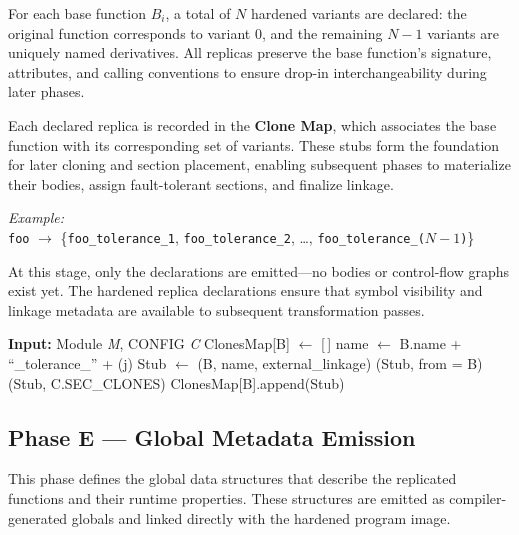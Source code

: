 For each base function \(B_i\), a total of \(N\) hardened variants are declared:
the original function corresponds to variant 0, and the remaining \(N{-}1\)
variants are uniquely named derivatives. All replicas preserve the base
function’s signature, attributes, and calling conventions to ensure drop-in
interchangeability during later phases.

Each declared replica is recorded in the \textbf{Clone Map}, which associates
the base function with its corresponding set of variants. These stubs form
the foundation for later cloning and section placement, enabling subsequent
phases to materialize their bodies, assign fault-tolerant sections, and
finalize linkage.

\begin{center}
\textit{Example:} \\
\texttt{foo} $\rightarrow$ 
\{\texttt{foo\_tolerance\_1}, \texttt{foo\_tolerance\_2}, \ldots, \texttt{foo\_tolerance\_(\(N{-}1\))}\}
\end{center}

At this stage, only the declarations are emitted—no bodies or control-flow
graphs exist yet. The hardened replica declarations ensure that symbol
visibility and linkage metadata are available to subsequent transformation
passes.

\begin{algorithm}[H]
\caption{Phase D — Create Empty Clone Stubs}
\label{alg:phaseD}
\begin{algorithmic}[1]
\State \textbf{Input:} Module \textit{M}, CONFIG \textit{C}
  \State ClonesMap[B] $\gets$ [\,]
    \State name $\gets$ B.name + ``\_tolerance\_'' + (j)
    \State Stub $\gets$ (B, name, external\_linkage)
    \State {}(Stub, from = B)
     \State {}(Stub, C.SEC\_CLONES) \EndIf
    \State ClonesMap[B].append(Stub)
  \EndFor
\EndFor
\end{algorithmic}
\end{algorithm}
\clearpage

\subsection*{Phase E — Global Metadata Emission}
This phase defines the global data structures that describe the replicated
functions and their runtime properties. These structures are emitted as
compiler-generated globals and linked directly with the hardened program image.

